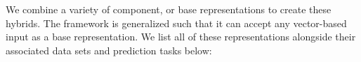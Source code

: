 We combine a variety of component, or base representations to create these hybrids. The framework is generalized such that it can accept any vector-based input as a base representation. We list all of these representations alongside their associated data sets and prediction tasks below:


